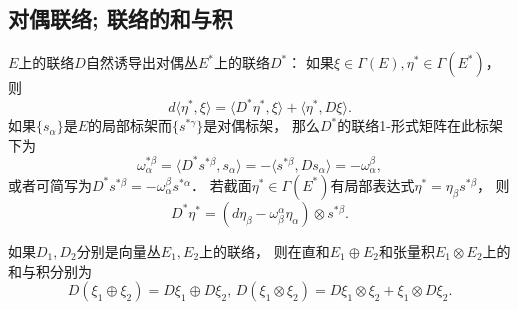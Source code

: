 \subsection{对偶联络; 联络的和与积}
$E$上的联络$D$自然诱导出对偶丛$E^*$上的联络$D^*$： 如果$\xi\in\Gamma(E),\eta^*\in\Gamma(E^*)$， 则
$$
d\langle \eta^*,\xi\rangle=\langle D^*\eta^*,\xi\rangle+\langle \eta^*,D\xi\rangle.
$$
如果$\{s_\alpha\}$是$E$的局部标架而$\{s^{*\gamma}\}$是对偶标架， 那么$D^*$的联络1-形式矩阵在此标架下为
$$
\omega^{*\beta}_\alpha
=\langle D^*s^{*\beta},s_\alpha\rangle
=-\langle s^{*\beta},Ds_\alpha\rangle
=-\omega^\beta_\alpha,
$$
或者可简写为$D^*s^{*\beta}=-\omega^\beta_\alpha s^{*\alpha}$． 若截面$\eta^*\in\Gamma(E^*)$有局部表达式$\eta^*=\eta_\beta s^{*\beta}$， 则
$$
D^*\eta^*=(d\eta_\beta-\omega_\beta^\alpha\eta_\alpha)\otimes s^{*\beta}.
$$

如果$D_1,D_2$分别是向量丛$E_1,E_2$上的联络， 则在直和$E_1\oplus E_2$和张量积$E_1\otimes E_2$上的和与积分别为
$$
D(\xi_1\oplus \xi_2)=D\xi_1\oplus D\xi_2,
\,
D(\xi_1\otimes \xi_2)=D\xi_1\otimes \xi_2+\xi_1\otimes D\xi_2.
$$